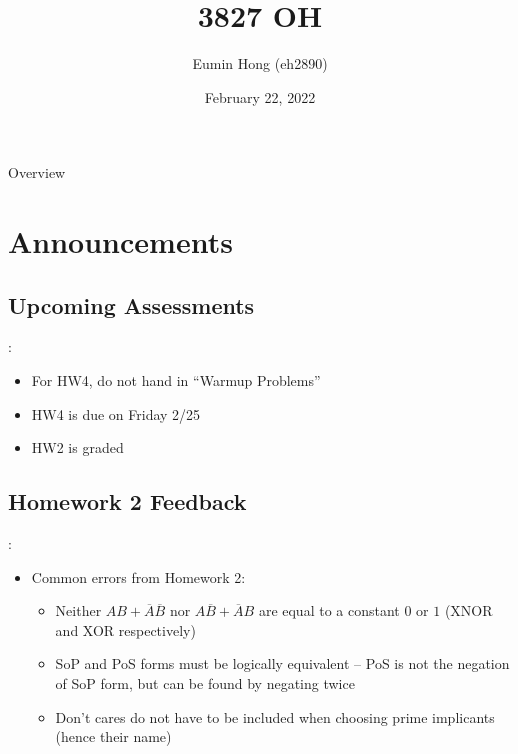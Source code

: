 \documentclass{../slides}
\title{3827 OH}
\author{Eumin Hong (eh2890)}
\institute{Columbia University}
\date{February 22, 2022}
\begin{document}
\begin{frame}
    \titlepage
\end{frame}

\begin{frame}{Overview}
\begin{multicols}{2}
\tableofcontents
\end{multicols}
\end{frame}

\section{Announcements}
\subsection{Upcoming Assessments}
\begin{frame}{\secname: \subsecname}
    \begin{itemize}
        \item For HW4, do not hand in \enquote{Warmup Problems}
        \item HW4 is due on Friday 2/25
        \item HW2 is graded
    \end{itemize}
\end{frame}

\subsection{Homework 2 Feedback}
\begin{frame}{\secname: \subsecname}
    \begin{itemize}
        \item Common errors from Homework 2:
        \begin{itemize}
            \item Neither $AB + \overbar{A}\overbar{B}$ nor $A\overbar{B} + \overbar{A}B$ are equal to a constant $0$ or $1$ (XNOR and XOR respectively)
            \item SoP and PoS forms must be logically equivalent -- PoS is not the negation of SoP form, but can be found by negating twice
            \item Don't cares do not have to be included when choosing prime implicants (hence their name)
        \end{itemize}
    \end{itemize}
\end{frame}
\end{document}
